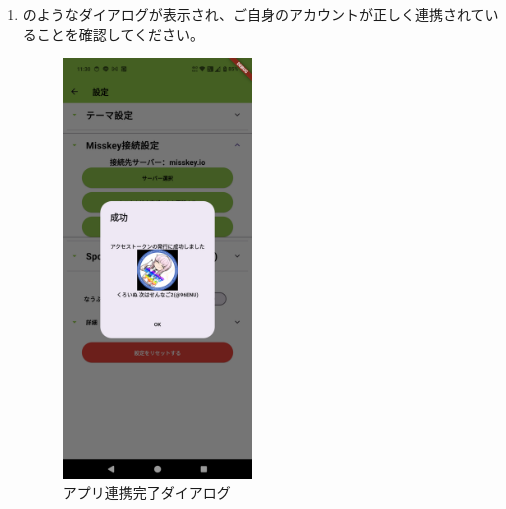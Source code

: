 \begin{enumerate}
                \newpage
                \item {}のようなダイアログが表示され、ご自身のアカウントが正しく連携されていることを確認してください。
                    \begin{figure}[htbp]
                        \centering
                        \includegraphics[width=5cm]{./pictures/misskey7.png}
                        \caption{アプリ連携完了ダイアログ}
                        \label{img:misskey7}
                    \end{figure}
            \end{enumerate}

        \newpage
